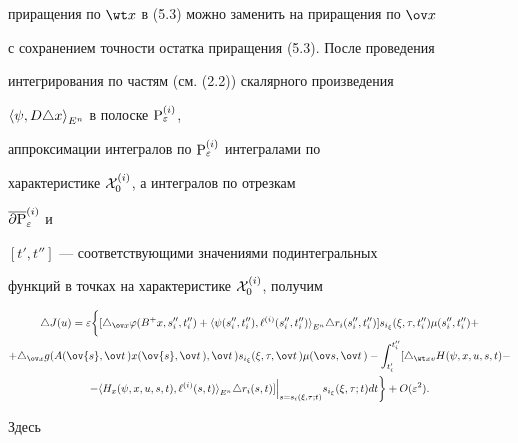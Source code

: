 приращения по $\wt x$ в (5.3) можно заменить на приращения по $\ov x$


с сохранением точности остатка приращения (5.3). После проведения


интегрирования по частям (см. (2.2)) скалярного произведения 


${\la \psi, D \triangle x\ra}_{E^n}$ в полоске ${\P}_{\varepsilon}^{(i)}$,


аппроксимации интегралов по ${\P}_{\varepsilon}^{(i)}$ интегралами по


характеристике ${\cal X}_{0}^{(i)}$, а интегралов по отрезкам


$\overline{\partial{\P}}_{\varepsilon}^{(i)}$ и


$[t', t'']$ --- соответствующими значениями подинтегральных


функций в точках на характеристике ${\cal X}_{0}^{(i)}$, получим


\begin{multline}


\triangle J(u) = \varepsilon \bigg\{ [ \triangle_{\ov x} \varphi


(B^{+}x,s''_i,t''_i) +


{\la \psi(s''_i,t''_i), \ell^{(i)}


(s''_i,t''_i) \ra}_{E^n}


\triangle r_i (s''_i,t''_i) ]


s_{i_\xi} (\xi,\tau, t''_i)


\mu (s''_i,t''_i) + \\


%


+\triangle_{\ov x} g(A(\ov{s},\ov t\,) x(\ov{s},\ov t\,), \ov t\,)


s_{i_\xi} (\xi,\tau,\ov t\,)\mu (\ov s,\ov t\,) -


\int_{t_{i}'}^{t_{i}''} [ 


\triangle_{\wt x v} H(\psi, x,u,s,t) -\\


%


-{\la H_{x}(\psi,x,u,s,t),


\ell^{(i)}(s,t) \ra}_{E^n}


\triangle r_i (s,t) ]


{\Big|}_{s = s_{i}(\xi, \tau; t)} s_{i_{\xi}} 


(\xi, \tau; t) dt \bigg\} + O(\varepsilon^2).


\end{multline}


Здесь


